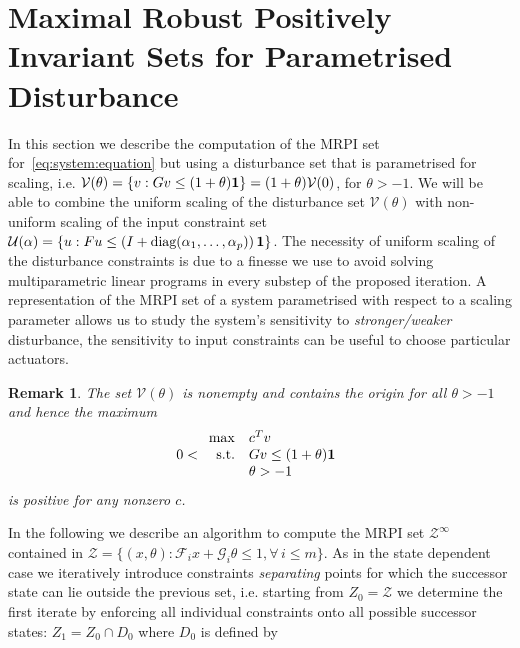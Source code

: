\documentclass[letterpaper, 10pt, conference]{ieeeconf} %
\newtheorem{rem}[thm]{Remark}
\begin{document}
\section{Maximal Robust Positively Invariant Sets for Parametrised Disturbance}\label{sec:MRPI:parametrised}
%
%
In this section we describe the computation of the MRPI set for~\eqref{eq:system:equation}
but using a disturbance set that is parametrised for scaling, i.e. $\mathcal V(\theta) = \{v: Gv\leq(1+\theta){\bf{1}}\} 
= (1+\theta)\mathcal V(0)$, for $\theta>-1$. We will be able to combine the uniform scaling of 
the disturbance set $\mathcal V(\theta)$ with non-uniform scaling of the input constraint set
$\mathcal U({\bf{\alpha}}) = \{u: Fu\leq\left(I+\text{diag}(\alpha_1,\dots,\alpha_p)\right){\bf{1}}\}$.
The necessity of uniform scaling of the disturbance constraints is due to a finesse we use to avoid
solving multiparametric linear programs in every substep of the proposed iteration.
A representation of the MRPI set of a system parametrised with respect to a scaling parameter allows us
to study the system's sensitivity to \emph{stronger/weaker} disturbance, the sensitivity to input 
constraints can be useful to choose particular actuators.
%
\begin{rem}
The set $\mathcal V(\theta)$ is nonempty and contains the origin for all $\theta>-1$ and hence the 
maximum
%
\[
0<\begin{array}{rl}
\max & c^T v\\
\text{s.t.}& Gv \leq (1+\theta){\bf{1}}\\
&\theta>-1
\end{array}
\]
%
is positive for any nonzero $c$.
\end{rem}
%
In the following we describe an algorithm to compute the MRPI set $\mathcal Z^\infty$ contained in 
$\mathcal Z = \{(x,\theta):\mathcal F_i x+\mathcal G_i\theta \leq 1,\forall\, i\leq m\}$.
As in the state dependent case we iteratively introduce constraints \emph{separating} points
for which the successor state can lie outside the previous set, i.e. starting from $Z_0 = \mathcal Z$
we determine the first iterate by enforcing all individual constraints onto all possible successor states:
$Z_1=Z_0\cap D_0$ where $D_0$ is defined by
%
\end{document}
